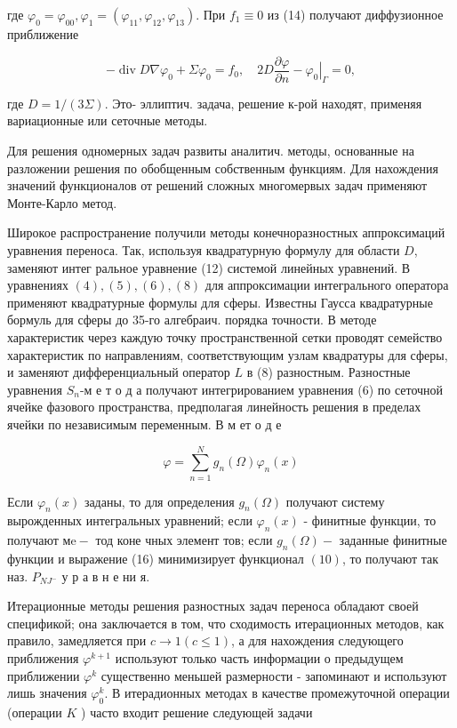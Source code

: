 \documentclass[10pt]{article}
\begin{document}
где $\varphi_{0}=\varphi_{00}, \varphi_{1}=\left(\varphi_{11}, \varphi_{12}, \varphi_{13}\right)$. При $f_{1} \equiv 0$ из (14) получают диффузионное приближение

\[
-\operatorname{div} D \nabla \varphi_{0}+\Sigma \varphi_{0}=f_{0}, \quad 2 D \frac{\partial \varphi}{\partial n}-\left.\varphi_{0}\right|_{\Gamma}=0,
\]

где $D=1 /(3 \Sigma)$. Это- эллиптич. задача, решение к-рой находят, применяя вариационные или сеточные методы.

Для решения одномерных задач развиты аналитич. методы, основанные на разложении решения по обобщенным собственным функциям. Для нахождения значений функционалов от решений сложных многомервых задач применяют Монте-Карло метод.

Широкое распространение получили методы конечноразностных аппроксимаций уравнения переноса. Так, используя квадратурную формулу для области $D$, заменяют интег ральное уравнение (12) системой линейных уравнений. В уравнениях $(4),(5),(6),(8)$ для аппроксимации интегрального оператора применяют квадратурные формулы для сферы. Известны Гаусса квадратурные бормуль для сферы до 35-го алгебраич. порядка точности. В методе характеристик через каждую точку пространственной сетки проводят семейство характеристик по направлениям, соответствующим узлам квадратуры для сферы, и заменяют дифференциальный оператор $L$ в (8) разностным. Разностные уравнения $S_{n}$-м е т о д а получают интегрированием уравнения (6) по сеточной ячейке фазового пространства, предполагая линейность решения в пределах ячейки по независимым переменным. В м ет о д е

\[
\varphi=\sum_{n=1}^{N} g_{n}(\Omega) \varphi_{n}(x)
\]

Если $\varphi_{n}(x)$ заданы, то для определения $g_{n}(\Omega)$ получают систему вырожденных интегральных уравнений; если $\varphi_{n}(x)$ - финитные функции, то получают $м \mathrm{e}-$ тод коне чных элемент тов; если $g_{n}(\Omega)-$ заданные финитные функции и выражение (16) минимизирует функционал $(10)$, то получают так наз. $P_{N J^{-}}$ у р а в н е ни я.

Итерационные методы решения разностных задач переноса обладают своей спецификой; она заключается в том, что сходимость итерационных методов, как правило, замедляется при $c \rightarrow 1(c \leqslant 1)$, а для нахождения следующего приближения $\varphi^{k+1}$ используют только часть информации $о$ предыдущем приближении $\varphi^{k}$ существенно меньшей размерности - запоминают и используют лишь значения $\varphi_{0}^{k}$. В итерадионных методах в качестве промежуточной операции (операции $K$ ) часто входит решение следующей задачи
\end{document}
